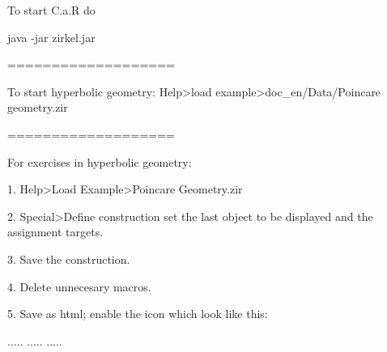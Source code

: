 To start C.a.R do

java -jar zirkel.jar

===================

To start hyperbolic geometry:
Help>load example>doc_en/Data/Poincare geometry.zir

===================

For exercises in hyperbolic geometry:

1. Help>Load Example>Poincare Geometry.zir

2. Special>Define construction set the last object to be displayed and the assignment targets.

3. Save the construction.

4. Delete unnecesary macros.

5. Save as html; enable the icon which look like this:

.....
.....
.....
